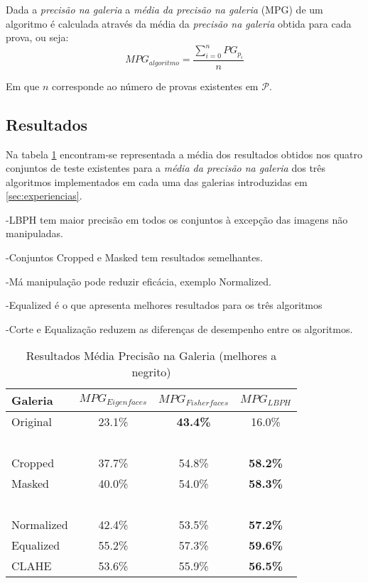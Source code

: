 Dada a \textit{precisão na galeria} a \textit{média da precisão na galeria} (MPG) de um algoritmo é calculada através da média da \textit{precisão na galeria} obtida para cada prova, ou seja:
\begin{equation}
MPG_{algoritmo} = \frac{ \sum\limits_{i=0}^{n} PG_{p_i} }{n}
\end{equation}

Em que $n$ corresponde ao número de provas existentes em $\mathscr{P}$.

\subsection{Resultados}
Na tabela \ref{tab:resultadosprecicao} encontram-se representada a média dos resultados obtidos nos quatro conjuntos de teste existentes para a \textit{média da precisão na galeria} dos três algoritmos implementados em cada uma das galerias introduzidas em \ref{sec:experiencias}.

-LBPH tem maior precisão em todos os conjuntos à excepção das imagens não manipuladas.

-Conjuntos Cropped e Masked tem resultados semelhantes.

-Má manipulação pode reduzir eficácia, exemplo Normalized.

-Equalized é o que apresenta melhores resultados para os três algoritmos

-Corte e Equalização reduzem as diferenças de desempenho entre os algoritmos.

\begin{center}
\begin{table}
    \begin{center}
    \caption{Resultados Média Precisão na Galeria (melhores a negrito)}
    \begin{tabular}{l|ccc}
    Galeria    & $MPG_{Eigenfaces}$ & $MPG_{Fisherfaces}$ & $MPG_{LBPH}$ \\ 
    \hline\hline
    Original   & 23.1\%          & \textbf{43.4\%}  & 16.0\%             \\
    ~ \\
    Cropped    & 37.7\%          & 54.8\%           & \textbf{58.2\%}    \\
    Masked     & 40.0\%          & 54.0\%           & \textbf{58.3\%}    \\
    ~ \\
    Normalized & 42.4\%          & 53.5\%           & \textbf{57.2\%}    \\
    Equalized  & 55.2\%          & 57.3\%           & \textbf{59.6\%}    \\
    CLAHE      & 53.6\%          & 55.9\%           & \textbf{56.5\%}    \\
    \hline\hline
    \end{tabular}
    \label{tab:resultadosprecicao}
    \end{center}
\end{table}
\end{center}


